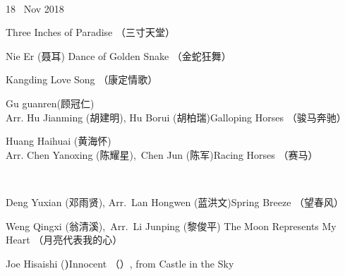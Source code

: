 \documentclass[letter,6pt,poets]{ConcProg}
\begin{document}
\begin{spacing}{1.0}
\begin{programme}{
\\  {\normalsize 18 ~Nov 2018}
}
\begin{part}[]
\begin{composition}{}{}{Three Inches of Paradise  （三寸天堂）}{}
    \end{composition}
    \begin{composition}{Nie Er (聂耳)} {}{Dance of Golden Snake  （金蛇狂舞）}{}
    \end{composition}
    \begin{composition}{}{}{Kangding Love Song  （康定情歌）}{}
    \end{composition}
    \begin{composition}{Gu guanren(顾冠仁)\\ Arr. Hu Jianming (胡建明), Hu Borui (胡柏瑞)}{}{Galloping Horses  （骏马奔驰）}{}
    \end{composition}
    \begin{composition}{Huang Haihuai (黄海怀)\\ Arr. Chen Yanoxing (陈耀星),\  Chen Jun (陈军)}{}{Racing Horses  （赛马）}{}
    \end{composition}\\
    \begin{composition}{Deng Yuxian (邓雨贤), Arr.\ Lan Hongwen (蓝洪文)}{}{Spring Breeze  （望春风）}{}
    \end{composition}
    \begin{composition}{Weng Qingxi (翁清溪),\ Arr.\ Li Junping (黎俊平) }{}{The Moon Represents My Heart  （月亮代表我的心）}{}
    \end{composition}
    \begin{composition}{Joe Hisaishi (\textbf{)}}{}{Innocent （）, from Castle in the Sky }{}
                   {}{}
    \end{composition}
    
    



\end{part}
\end{programme}
\end{spacing}
\end{document}
